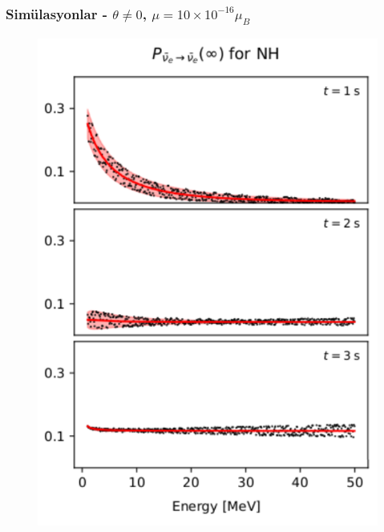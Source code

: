 \documentclass[10pt]{beamer}
\begin{document}
\begin{frame}
    \frametitle{Simülasyonlar - $\theta\ne0$, $\mu=10\times10^{-16}\mu_{B}$ }
    \begin{minipage}{0.45\textwidth}
        \begin{figure}[hbt!]
            \centering
            \includegraphics[width=\textwidth]{fig/8_1.pdf}
        \end{figure}
    \end{minipage}
    \hfill
    \begin{minipage}{0.45\textwidth}
        \begin{figure}[hbt!]
            \centering

\end{figure}
\end{minipage}
\end{frame}
\end{document}
